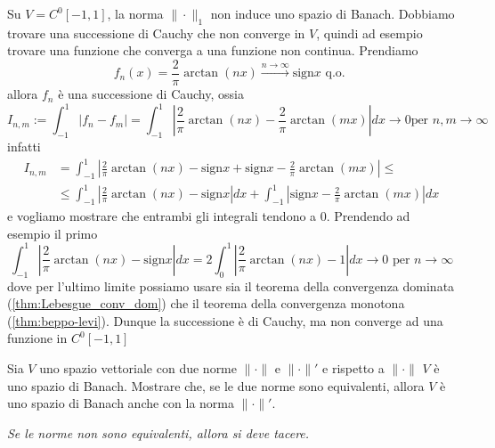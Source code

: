 \begin{example}\label{ex:non_banach}
    Su \(V = C^{0}[-1, 1]\), la norma \(\|\cdot \|_1\) non induce uno spazio di
    Banach. Dobbiamo trovare una successione di Cauchy che non converge in
    \(V\), quindi ad esempio trovare una funzione che converga a una funzione
    non continua.
    Prendiamo 
    \[
        f_{n}{(x)} = \frac{2}{\pi}\arctan {(nx)} \overset{n \to
        \infty}{\longrightarrow} \text{sign} x \text{ q.o. }
    \]
    allora \(f_{n}\) è una successione di Cauchy, ossia
    \[
        I_{n,m} := \int_{-1}^{1} |f_{n} - f_{m}| = \int_{-1}^{1} \left| \frac{2}{\pi}
        \arctan {(nx)} - \frac{2}{\pi} \arctan {(mx)} \right| dx \to 0 \text{
        per } n, m \to \infty 
    \]
    infatti
    \begin{align*}
        I_{n,m} &= \int_{-1} ^{1}\left| \frac{2}{\pi}\arctan {(nx)} -
        \text{sign}x + \text{sign}x - \frac{2}{\pi}\arctan {(mx)} \right| \le \\
        &\le \int_{-1} ^{1} \left| \frac{2}{\pi}\arctan {(nx)} - \text{sign}x
        \right| dx + \int_{-1} ^{1} \left| \text{sign}x - \frac{2}{\pi}\arctan
        {(mx)} \right| dx
    \end{align*}
    e vogliamo mostrare che entrambi gli integrali tendono a 0. Prendendo ad
    esempio il primo
    \[
        \int_{-1} ^{1} \left| \frac{2}{\pi}\arctan {(nx)} - \text{sign}x
        \right| dx = 2 \int_{0} ^{1} \left| \frac{2}{\pi}\arctan {(nx)} -
        1\right| dx \to 0 \text{ per } n \to \infty
    \]
    dove per l'ultimo limite possiamo usare sia il teorema della convergenza
    dominata (\ref{thm:Lebesgue_conv_dom}) che il teorema della convergenza
    monotona (\ref{thm:beppo-levi}). Dunque la successione è di Cauchy, ma non
    converge ad una funzione in \(C^{0}[-1, 1]\) 
\end{example}
\begin{eser}
    Sia \(V\) uno spazio vettoriale con due norme \(\|\cdot \|\) e \(\|\cdot
    \|'\) e rispetto a \(\|\cdot \|\) \(V\) è uno spazio di Banach. Mostrare
    che, se le due norme sono equivalenti, allora \(V\) è uno spazio di Banach
    anche con la norma \(\|\cdot \|'\).
\end{eser}
\begin{remark}
    \textit{Se le norme non sono equivalenti, allora si deve tacere.}
\end{remark}

